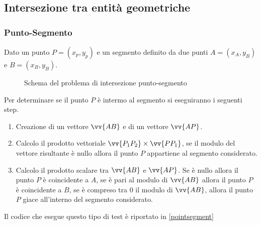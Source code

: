 \subsection{Intersezione tra entità geometriche}
%
\subsubsection{Punto-Segmento}
Dato un punto $P = (x_p, y_p)$ e un segmento definito da due punti $A = (x_A, y_B)$ e $B = (x_B, y_B)$.

\begin{figure}[h!]
	\centering
	\caption{Schema del problema di intersezione punto-segmento}
\end{figure}
\noindent
Per determinare se il punto $P$ è intermo al segmento si eseguiranno i seguenti step.
\begin{enumerate}
	\item Creazione di un vettore $\vv{AB}$ e di un vettore $\vv{AP}$.
	\item Calcolo il prodotto vettoriale  $\vv{P_1P_2} \times  \vv{PP_1}$, se il modulo del vettore risultante è nullo allora il punto $P$ appartiene al segmento considerato.
	\item Calcolo il prodotto scalare tra $\vv{AB}$ e $\vv{AP}$. Se è nullo allora il punto $P$ è coincidente a $A$, se è pari al modulo di $\vv{AB}$ allora il punto $P$ è coincidente a $B$, se è compreso tra 0 il modulo di $\vv{AB}$, allora il punto $P$ giace all'interno del segmento considerato.
\end{enumerate}
Il codice che esegue questo tipo di test è riportato in \figurename{ \ref{pointsegment}}

